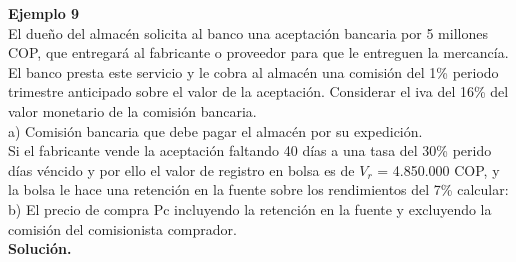 
\textbf{Ejemplo 9}\\
El dueño del almacén solicita al banco una aceptación bancaria por 5 millones COP, que
entregará al fabricante o proveedor para que le entreguen la mercancía. El banco presta
este servicio y le cobra al almacén una comisión del 1\% periodo trimestre anticipado sobre
el valor de la aceptación. Considerar el iva del 16\% del valor monetario de la comisión
bancaria.\\
a) Comisión bancaria que debe pagar el almacén por su expedición.\\
Si el fabricante vende la aceptación faltando 40 días a una tasa del 30\% perido días véncido y por ello el
valor de registro en bolsa es de $V_{r}$ = 4.850.000 COP, y la bolsa le hace una retención en la fuente sobre los rendimientos del 7\% calcular: \\
b) El precio de compra Pc incluyendo la retención en la fuente y excluyendo la comisión
del comisionista comprador. \\ 
\textbf{Solución.}
